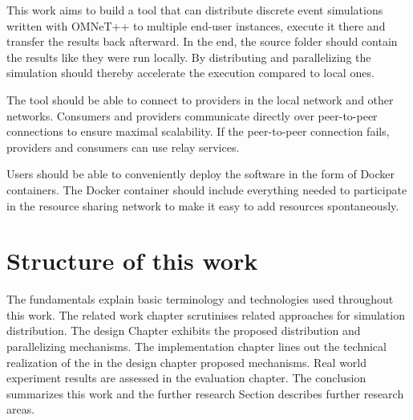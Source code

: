 This work aims to build a tool that can distribute discrete event simulations written with OMNeT++ to multiple end-user instances, execute it there and transfer the results back afterward. In the end, the source folder should contain the results like they were run locally. By distributing and parallelizing the simulation should thereby accelerate the execution compared to local ones.

The tool should be able to connect to providers in the local network and other networks. Consumers and providers communicate directly over peer-to-peer connections to ensure maximal scalability. If the peer-to-peer connection fails, providers and consumers can use relay services.

Users should be able to conveniently deploy the software in the form of Docker containers. The Docker container should include everything needed to participate in the resource sharing network to make it easy to add resources spontaneously.

\section{Structure of this work}
The fundamentals explain basic terminology and technologies used throughout this work. The related work chapter scrutinises related approaches for simulation distribution. The design Chapter exhibits the proposed distribution and parallelizing mechanisms. The implementation chapter lines out the technical realization of the in the design chapter proposed mechanisms. Real world experiment results are assessed in the evaluation chapter. The conclusion summarizes this work and the further research Section describes further research areas.

